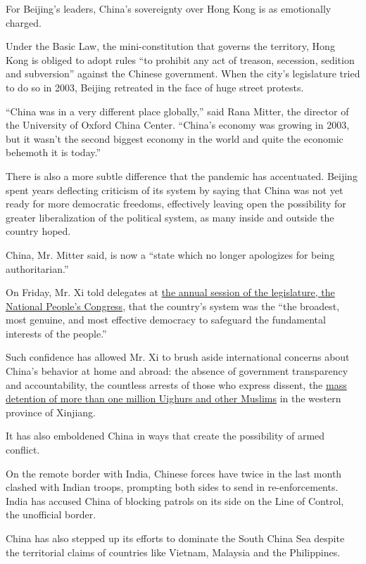 For Beijing's leaders, China's sovereignty over Hong Kong is as
emotionally charged.

Under the Basic Law, the mini-constitution that governs the territory,
Hong Kong is obliged to adopt rules ``to prohibit any act of treason,
secession, sedition and subversion'' against the Chinese government.
When the city's legislature tried to do so in 2003, Beijing retreated in
the face of huge street protests.

``China was in a very different place globally,'' said Rana Mitter, the
director of the University of Oxford China Center. ``China's economy was
growing in 2003, but it wasn't the second biggest economy in the world
and quite the economic behemoth it is today.''

There is also a more subtle difference that the pandemic has
accentuated. Beijing spent years deflecting criticism of its system by
saying that China was not yet ready for more democratic freedoms,
effectively leaving open the possibility for greater liberalization of
the political system, as many inside and outside the country hoped.

China, Mr. Mitter said, is now a ``state which no longer apologizes for
being authoritarian.''

On Friday, Mr. Xi told delegates at
\href{https://www.nytimes.com/2020/05/21/business/economy/coronavirus-china-economy.html}{the
annual session of the legislature, the National People's Congress}, that
the country's system was the ``the broadest, most genuine, and most
effective democracy to safeguard the fundamental interests of the
people.''

Such confidence has allowed Mr. Xi to brush aside international concerns
about China's behavior at home and abroad: the absence of government
transparency and accountability, the countless arrests of those who
express dissent, the
\href{https://www.nytimes.com/interactive/2019/11/16/world/asia/china-xinjiang-documents.html}{mass
detention of more than one million Uighurs and other Muslims} in the
western province of Xinjiang.

It has also emboldened China in ways that create the possibility of
armed conflict.

On the remote border with India, Chinese forces have twice in the last
month clashed with Indian troops, prompting both sides to send in
re-enforcements. India has accused China of blocking patrols on its side
on the Line of Control, the unofficial border.

China has also stepped up its efforts to dominate the South China Sea
despite the territorial claims of countries like Vietnam, Malaysia and
the Philippines.

